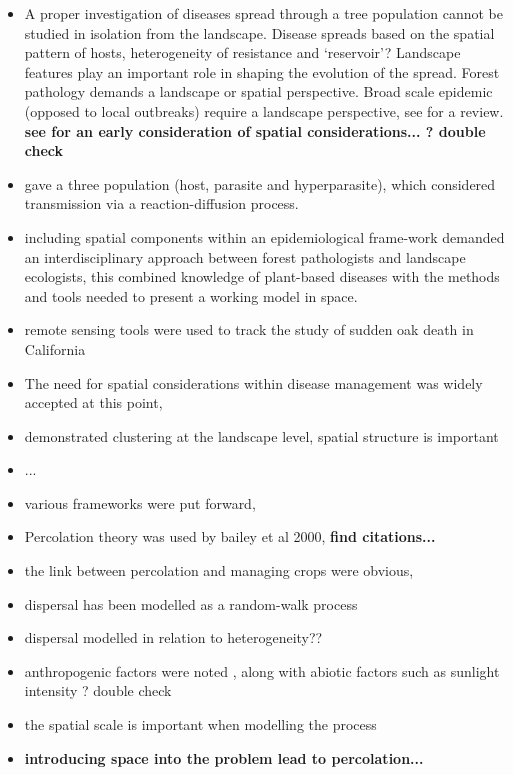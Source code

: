 \begin{itemize}
    \item A proper investigation of diseases spread through a tree population cannot be studied in isolation from the landscape. Disease spreads based on the spatial pattern of hosts, heterogeneity of resistance and `reservoir'? Landscape features play an important role in shaping the evolution of the spread. Forest pathology demands a landscape or spatial perspective. Broad scale epidemic (opposed to local outbreaks) require a landscape perspective, see \cite{pub.1012384986} for a review. \textbf{see \cite{pub.1073292723} for an early consideration of spatial considerations... ? double check}
    \item \cite{doi:10.1098/rstb.1998.0226} gave a three population (host, parasite and hyperparasite), which considered transmission via a reaction-diffusion process.
    \item including spatial components within an epidemiological frame-work demanded an interdisciplinary approach between forest pathologists and landscape ecologists, this combined knowledge of plant-based diseases with the methods and tools needed to present a working model in space.
    \item remote sensing tools were used \cite{kelly2002monitoring} to track the study of sudden oak death in California
    \item The need for spatial considerations within disease management was widely accepted at this point,
    \item \cite{kelly2002landscape} demonstrated clustering at the landscape level, spatial structure is important
    \item ... 
    \item various frameworks were put forward, \cite[see][for a detailed analysis]{Gilligan-disease-management}
    \item Percolation theory was used by bailey et al 2000, \textbf{find citations...}
    \item the link between percolation and managing crops were obvious, 
    \item dispersal has been modelled as a random-walk process \cite{PhysRevE.67.031913}
    \item dispersal modelled in relation to heterogeneity?? \cite{CARACO2001185}
    \item anthropogenic factors were noted \cite{doi:10.1890/0012-9658(2002)083[3167:SOAIPO]2.0.CO;2}, along with abiotic factors \cite{doi:10.1046/j.1439-0434.2003.00730.x} such as sunlight intensity ? double check
    \item \cite{doi:10.1046/j.1442-9993.2002.01202.x} the spatial scale is important when modelling the process \cite{spatial-scale}
    \item \textbf{introducing space into the problem lead to percolation...}
\end{itemize}

